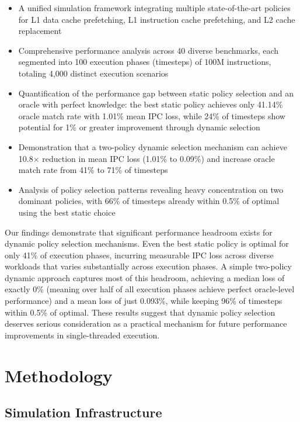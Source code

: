 \documentclass[conference]{IEEEtran}
\begin{document}
\begin{itemize}
\item A unified simulation framework integrating multiple state-of-the-art policies for L1 data cache prefetching, L1 instruction cache prefetching, and L2 cache replacement
\item Comprehensive performance analysis across 40 diverse benchmarks, each segmented into 100 execution phases (timesteps) of 100M instructions, totaling 4,000 distinct execution scenarios
\item Quantification of the performance gap between static policy selection and an oracle with perfect knowledge: the best static policy achieves only 41.14\% oracle match rate with 1.01\% mean IPC loss, while 24\% of timesteps show potential for 1\% or greater improvement through dynamic selection
\item Demonstration that a two-policy dynamic selection mechanism can achieve 10.8$\times$ reduction in mean IPC loss (1.01\% to 0.09\%) and increase oracle match rate from 41\% to 71\% of timesteps
\item Analysis of policy selection patterns revealing heavy concentration on two dominant policies, with 66\% of timesteps already within 0.5\% of optimal using the best static choice
\end{itemize}

Our findings demonstrate that significant performance headroom exists for dynamic policy selection mechanisms. Even the best static policy is optimal for only 41\% of execution phases, incurring measurable IPC loss across diverse workloads that varies substantially across execution phases. A simple two-policy dynamic approach captures most of this headroom, achieving a median loss of exactly 0\% (meaning over half of all execution phases achieve perfect oracle-level performance) and a mean loss of just 0.093\%, while keeping 96\% of timesteps within 0.5\% of optimal. These results suggest that dynamic policy selection deserves serious consideration as a practical mechanism for future performance improvements in single-threaded execution.

\section{Methodology}

\subsection{Simulation Infrastructure}
\end{document}
